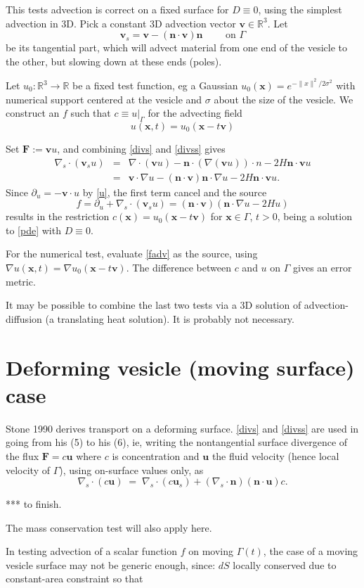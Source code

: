 \documentclass[11pt]{article}
\newcommand{\be}{\begin{equation}}
\newcommand{\ee}{\end{equation}}
\newcommand{\bea}{\begin{eqnarray}}
\newcommand{\eea}{\end{eqnarray}}
\newcommand{\mbf}[1]{{\mathbf #1}}
\newcommand{\R}{\mathbb{R}}
\newcommand{\x}{\mbf{x}}
\newcommand{\n}{\mbf{n}}
\newcommand{\uu}{\mbf{u}}
\newcommand{\vv}{\mbf{v}}
\begin{document}
This tests advection is correct on a fixed surface for $D\equiv 0$,
using the simplest advection in 3D.
Pick a constant 3D advection vector $\vv\in\R^3$.
Let
$$
\vv_s = \vv - (\n\cdot\vv)\n  \qquad \mbox{ on } \Gamma
$$
be its tangential part, which will advect material
from one end of the vesicle to the other, but slowing down at these ends (poles).

Let $u_0:\R^3\to\R$ be a fixed test function, eg a Gaussian
$u_0(\x) = e^{-\|x\|^2/2\sigma^2}$ with numerical support centered at the vesicle
and $\sigma$ about the size of the vesicle.
We construct an $f$ such that $c \equiv u|_\Gamma$ for the advecting
field
\be
u(\x,t) = u_0(\x - t\vv)
\label{u}
\ee

Set $\mbf{F} := \vv u$, and combining \eqref{divs} and \eqref{divss}
gives
\bea
\nabla_s\cdot(\vv_s u) &=& \nabla\cdot (\vv u) - \n\cdot (\nabla(\vv u)) \cdot n
- 2H \n \cdot\vv u
\nonumber\\
&=& \vv \cdot \nabla u - (\n\cdot\vv) \n\cdot \nabla u - 2H \n \cdot \vv u.
\eea
Since $\partial_u = -\vv\cdot u$ by \eqref{u}, the first term cancel
and the source
\be
f = \partial_u + \nabla_s\cdot(\vv_s u) = (\n\cdot\vv)(\n\cdot \nabla u - 2H u)
\label{fadv}
\ee
results in the restriction
$c(\x) = u_0(\x-t\vv)$ for $\x\in\Gamma$, $t>0$, being a
solution to \eqref{pde} with $D\equiv 0$.

For the numerical test,
evaluate \eqref{fadv} as the source, using
$\nabla u(\x,t) = \nabla u_0(\x-t\vv)$.
The difference between $c$ and $u$ on $\Gamma$ gives an error metric.

It may be possible to combine the last two tests via
a 3D solution of advection-diffusion (a translating heat solution).
It is probably not necessary.


\section{Deforming vesicle (moving surface) case}

Stone 1990 derives transport on a deforming surface.
\eqref{divs} and \eqref{divss} are used in going from his (5) to his (6),
ie, writing the nontangential surface divergence
of the flux $\mbf{F} = c\uu$ where $c$ is concentration and $\uu$ the
fluid velocity (hence local
velocity of $\Gamma$),
using on-surface values only, as
$$\nabla_s \cdot (c\uu) \;=\;
\nabla_s\cdot (c\uu_s) + (\nabla_s\cdot\n)
(\n\cdot\uu) c.$$

*** to finish.

The mass conservation test will also apply here.

In testing advection of a scalar function $f$ on moving
$\Gamma(t)$, the case of a moving vesicle surface
may not be generic enough,
since: $dS$ locally conserved due to constant-area constraint
so that 


%
%
\end{document}
